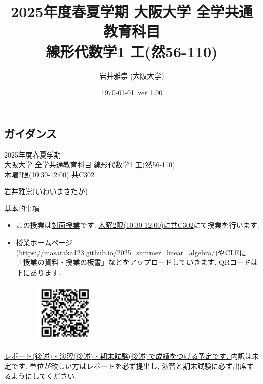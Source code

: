 \documentclass[dvipdfmx,a4paper,11pt]{article}
\title{2025年度春夏学期  大阪大学 全学共通教育科目 \\ 線形代数学1 工(然56-110)}
\author{岩井雅崇 (大阪大学)}
\date{\today \, ver 1.00}
\theoremstyle{definition}
\begin{document}
\maketitle
\setcounter{tocdepth}{2}
\tableofcontents
\newpage

\begin{center}
\setcounter{section}{-1}
\section{ガイダンス}
\label{sec-guide}
\end{center}

\begin{center}
{\Large 2025年度春夏学期 \\ 大阪大学 全学共通教育科目 線形代数学1 工(然56-110)} \\
木曜2限(10:30-12:00) 共C302
\end{center}
\begin{flushright}
 岩井雅崇(いわいまさたか) \\
\end{flushright}
{\Large \underline{基本的事項}}
\begin{itemize}
  \setlength{\parskip}{0cm} %
  \setlength{\itemsep}{0cm} %
\item この授業は\underline{対面授業}です. \underline{木曜2限(10:30-12:00)に共C302}にて授業を行います.
\item 授業ホームページ(\url{https://masataka123.github.io/2025_summer_linear_algebra/})やCLEに「授業の資料・授業の板書」などをアップロードしていきます. 
QRコードは下にあります.
\begin{figure}[htbp]
\begin{center}
 \includegraphics[height=30mm, width=30mm]{linalg.png}
\end{center}
\end{figure}
\end{itemize}

\vspace{-18pt}

\underline{レポート(後述)・演習(後述)・期末試験(後述)で成績をつける予定です. } 内訳は未定です. 
単位が欲しい方はレポートを必ず提出し, 演習と期末試験に必ず出席するようにしてください. 
\end{document}
